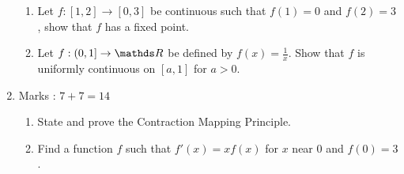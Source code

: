 \documentclass[../main-sheet.tex]{subfiles}
\begin{document}
\begin{enumerate}
\begin{enumerate}
              \item Let $ f: [1,2] \to [0, 3] $ be continuous such that $ f(1) = 0 $ and $ f(2) = 3 $, show that $ f $ has a fixed point.
              \item Let $ f:(0,1]\to\R  $ be defined by $ f(x)=\frac{1}{x} $. Show that $ f $ is uniformly continuous on $ [a,1] $ for $ a>0 $.
        \end{enumerate}
        \item Marks : $ 7+7=14 $
          \begin{enumerate}
            \item State and prove the Contraction Mapping Principle.
            \item Find a function $ f $ such that $ f'(x) = xf (x) $ for $ x $ near $ 0 $ and $ f(0) = 3 $.
        \end{enumerate}
    \end{enumerate}
\end{document}
